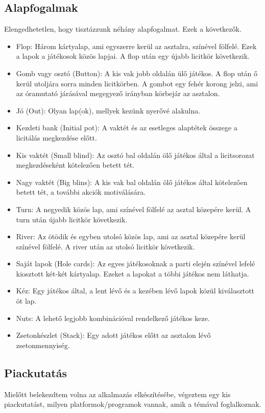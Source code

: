 \subsection{Alapfogalmak}
Elengedhetetlen, hogy tisztázzunk néhány alapfogalmat. Ezek a következők.
\cite{harrington}
\begin{itemize}
\item Flop: Három kártyalap, ami egyszerre kerül az asztalra, színével fölfelé. Ezek a lapok a játékosok közös lapjai. A flop után egy újabb licitkör következik.
\item Gomb vagy osztó (Button): A kis vak jobb oldalán ülő játékos. A flop után ő kerül utoljára sorra minden licitkörben. A gombot egy fehér korong jelzi, ami az óramutató járásával megegyező irányban körbejár az asztalon.
\item Jó (Out): Olyan lap(ok), mellyek kezünk nyerővé alakulna.
\item Kezdeti bank (Initial pot): A vaktét és az esetleges alaptétek összege a licitálás megkezdése előtt.
\item Kis vaktét (Small blind): Az osztó bal oldalán ölő játékos által a licitsorozat megkezdéseként kötelezően betett tét.
\item Nagy vaktét (Big blins): A kis vak bal oldalán ölő játékos által kötelezően betett tét, a további akciók motiválására.
\item Turn: A negyedik közös lap, ami színével fölfelé az asztal közepére kerül. A turn után újabb licitkör következik.
\item River: Az ötödik és egyben utolsó közös lap, ami az asztal közepére kerül színével fölfelé. A river után az utolsó licitkör következik.
\item Saját lapok (Hole cards): Az egyes játékosoknak a parti elején színével lefelé kiosztott két-két kártyalap. Ezeket a lapokat a többi játékos nem láthatja.
\item Kéz: Egy játékos által, a lent lévő és a kezében lévő lapok közül kiválasztott öt lap.
\item Nuts: A lehető legjobb kombinációval rendelkező játékos keze.
\item Zsetonkészlet (Stack): Egy adott játékos előtt az asztalon lévő zsetonmennyiség.
\end{itemize}

\subsection{Piackutatás}
Mielőtt belekezdtem volna az alkalmazás elkészítésébe, végeztem egy kis piackutatást, milyen platformok/programok vannak, amik a témával foglalkoznak.

